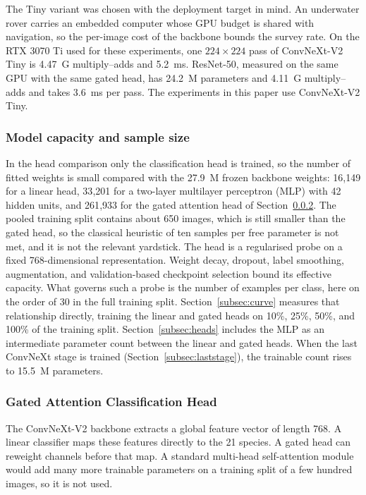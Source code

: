\documentclass[final,3p,times,twocolumn]{elsarticle}
\begin{document}
The Tiny variant was chosen with the deployment target in mind. An underwater rover carries an embedded computer whose GPU budget is shared with navigation, so the per-image cost of the backbone bounds the survey rate. On the RTX 3070 Ti used for these experiments, one \(224\times 224\) pass of ConvNeXt-V2 Tiny is 4.47~G multiply--adds and 5.2~ms. ResNet-50, measured on the same GPU with the same gated head, has 24.2~M parameters and 4.11~G multiply--adds and takes 3.6~ms per pass. The experiments in this paper use ConvNeXt-V2 Tiny.

\subsubsection{Model capacity and sample size}
\label{subsec:capacity}

In the head comparison only the classification head is trained, so the number of fitted weights is small compared with the 27.9~M frozen backbone weights: 16{,}149 for a linear head, 33{,}201 for a two-layer multilayer perceptron (MLP) with 42 hidden units, and 261{,}933 for the gated attention head of Section~\ref{subsec:gated}. The pooled training split contains about 650 images, which is still smaller than the gated head, so the classical heuristic of ten samples per free parameter is not met, and it is not the relevant yardstick. The head is a regularised probe on a fixed 768-dimensional representation. Weight decay, dropout, label smoothing, augmentation, and validation-based checkpoint selection bound its effective capacity. What governs such a probe is the number of examples per class, here on the order of 30 in the full training split. Section~\ref{subsec:curve} measures that relationship directly, training the linear and gated heads on 10\%, 25\%, 50\%, and 100\% of the training split. Section~\ref{subsec:heads} includes the MLP as an intermediate parameter count between the linear and gated heads. When the last ConvNeXt stage is trained (Section~\ref{subsec:laststage}), the trainable count rises to 15.5~M parameters.

\subsubsection{Gated Attention Classification Head}
\label{subsec:gated}

The ConvNeXt-V2 backbone extracts a global feature vector of length 768. A linear classifier maps these features directly to the 21 species. A gated head can reweight channels before that map. A standard multi-head self-attention module would add many more trainable parameters on a training split of a few hundred images, so it is not used.
\end{document}
